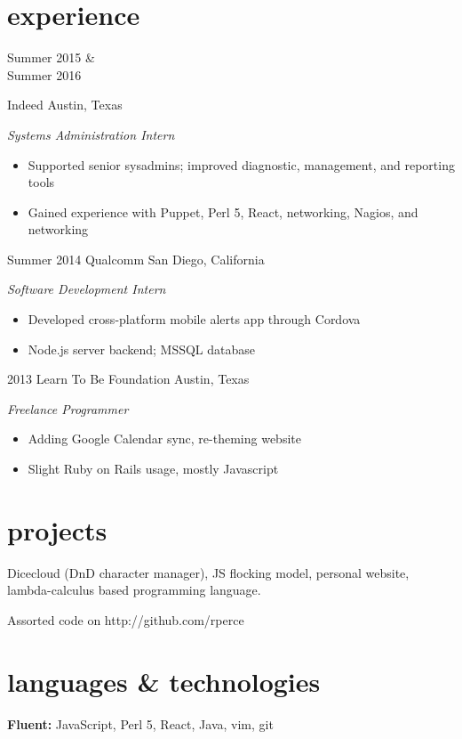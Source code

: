 \documentclass{friggeri-cv}
\begin{document}
\section{experience}
\begin{entrylist}
\entry%
{\parbox[t]{3cm}{Summer 2015 \&\\Summer 2016}}
{Indeed}
{Austin, Texas}
{\emph{Systems Administration Intern}
\begin{itemize}
\item Supported senior sysadmins; improved diagnostic, management, and reporting tools
\item Gained experience with Puppet, Perl 5, React, networking, Nagios, and networking
\end{itemize}}
\entry%
{Summer 2014}
{Qualcomm}
{San Diego, California}
{\emph{Software Development Intern}
\begin{itemize}
\item Developed cross-platform mobile alerts app through Cordova
\item Node.js server backend; MSSQL database
\end{itemize}}
\entry%
{2013}
{Learn To Be Foundation}
{Austin, Texas}
{\emph{Freelance Programmer}
\begin{itemize}
\item Adding Google Calendar sync, re-theming website
\item Slight Ruby on Rails usage, mostly Javascript
\end{itemize}}

\end{entrylist}
\vspace{-0.5cm}
\section{projects}
Dicecloud (DnD character manager), JS flocking model, personal website, lambda-calculus
based programming language.
\vspace{-0.15cm}

Assorted code on http://github.com/rperce
\section{languages \& technologies}
\textbf{Fluent:} JavaScript, Perl 5, React, Java, vim, git
\vspace{-0.15cm}
\end{document}
